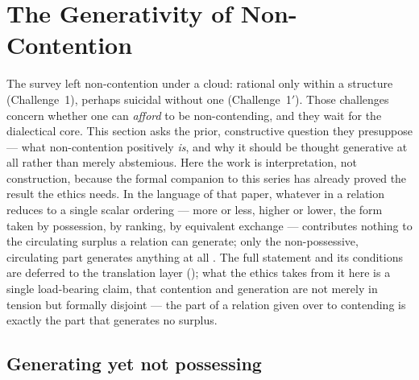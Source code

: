 \section{The Generativity of Non-Contention}
\label{p20:sec:noncontention}

\noindent
The survey left non-contention under a cloud: rational only within a structure (Challenge~1), perhaps suicidal without one (Challenge~1$'$). Those challenges concern whether one can \emph{afford} to be non-contending, and they wait for the dialectical core. This section asks the prior, constructive question they presuppose --- what non-contention positively \emph{is}, and why it should be thought generative at all rather than merely abstemious. Here the work is interpretation, not construction, because the formal companion to this series has already proved the result the ethics needs. In the language of that paper, whatever in a relation reduces to a single scalar ordering --- more or less, higher or lower, the form taken by possession, by ranking, by equivalent exchange --- contributes nothing to the circulating surplus a relation can generate; only the non-possessive, circulating part generates anything at all \parencite{wan2026braid}. The full statement and its conditions are deferred to the translation layer (); what the ethics takes from it here is a single load-bearing claim, that contention and generation are not merely in tension but formally disjoint --- the part of a relation given over to contending is exactly the part that generates no surplus.

\subsection{Generating yet not possessing}
\label{p20:sub:noncon-bushi}

